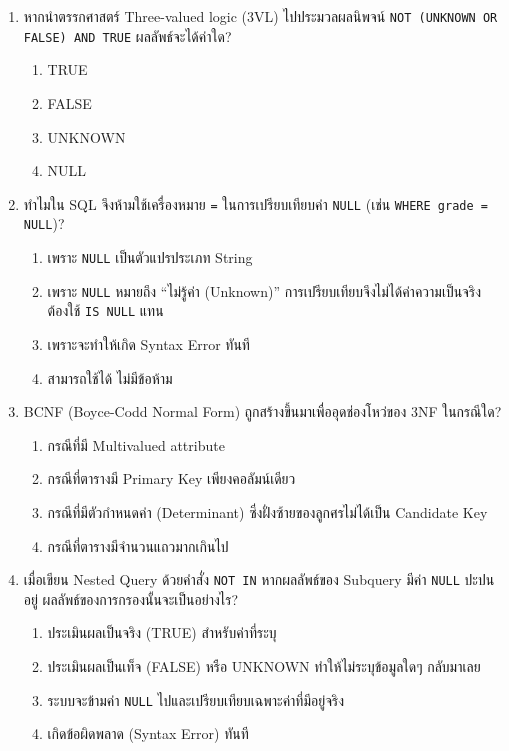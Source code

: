 \documentclass[a4paper,12pt]{article}
\begin{document}
\begin{enumerate}[label=\textbf{\arabic*.}]
    \item หากนำตรรกศาสตร์ Three-valued logic (3VL) ไปประมวลผลนิพจน์ \texttt{NOT (UNKNOWN OR FALSE) AND TRUE} ผลลัพธ์จะได้ค่าใด?
    \begin{enumerate}[label=\alph*.]
        \item TRUE
        \item FALSE
        \item UNKNOWN
        \item NULL
    \end{enumerate}

    \item ทำไมใน SQL จึงห้ามใช้เครื่องหมาย \texttt{=} ในการเปรียบเทียบค่า \texttt{NULL} (เช่น \texttt{WHERE grade = NULL})?
    \begin{enumerate}[label=\alph*.]
        \item เพราะ \texttt{NULL} เป็นตัวแปรประเภท String
        \item เพราะ \texttt{NULL} หมายถึง ``ไม่รู้ค่า (Unknown)'' การเปรียบเทียบจึงไม่ได้ค่าความเป็นจริง ต้องใช้ \texttt{IS NULL} แทน
        \item เพราะจะทำให้เกิด Syntax Error ทันที
        \item สามารถใช้ได้ ไม่มีข้อห้าม
    \end{enumerate}

    \item BCNF (Boyce-Codd Normal Form) ถูกสร้างขึ้นมาเพื่ออุดช่องโหว่ของ 3NF ในกรณีใด?
    \begin{enumerate}[label=\alph*.]
        \item กรณีที่มี Multivalued attribute
        \item กรณีที่ตารางมี Primary Key เพียงคอลัมน์เดียว
        \item กรณีที่มีตัวกำหนดค่า (Determinant) ซึ่งฝั่งซ้ายของลูกศรไม่ได้เป็น Candidate Key
        \item กรณีที่ตารางมีจำนวนแถวมากเกินไป
    \end{enumerate}

    \item เมื่อเขียน Nested Query ด้วยคำสั่ง \texttt{NOT IN} หากผลลัพธ์ของ Subquery มีค่า \texttt{NULL} ปะปนอยู่ ผลลัพธ์ของการกรองนั้นจะเป็นอย่างไร?
    \begin{enumerate}[label=\alph*.]
        \item ประเมินผลเป็นจริง (TRUE) สำหรับค่าที่ระบุ
        \item ประเมินผลเป็นเท็จ (FALSE) หรือ UNKNOWN ทำให้ไม่ระบุข้อมูลใดๆ กลับมาเลย
        \item ระบบจะข้ามค่า \texttt{NULL} ไปและเปรียบเทียบเฉพาะค่าที่มีอยู่จริง
        \item เกิดข้อผิดพลาด (Syntax Error) ทันที
    \end{enumerate}


\end{enumerate}
\end{document}
